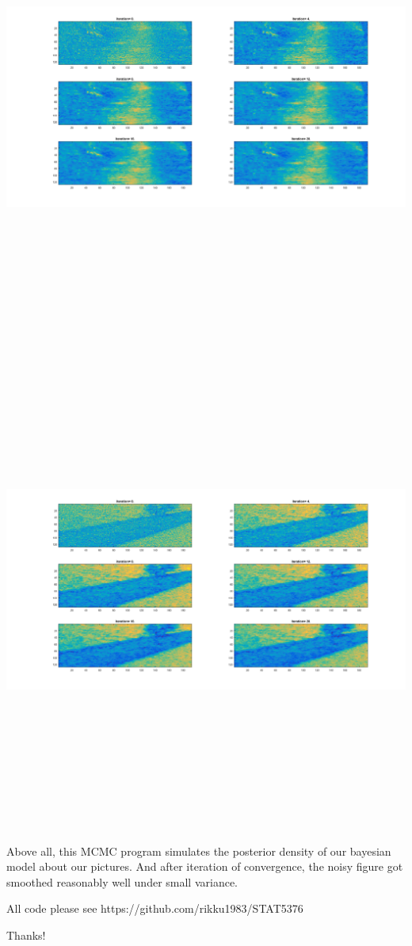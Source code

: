 \documentclass[11pt]{scrartcl}
\begin{document}
\includegraphics[width=160mm,height=160mm]{D4_10_20.png}\\
\includegraphics[width=160mm,height=160mm]{D5_10_20.png}\\
\bigskip

Above all, this MCMC program simulates the posterior density of our bayesian model about our pictures. And after iteration of convergence, the noisy figure got smoothed reasonably well under small variance. \\

\bigskip

All code please see https://github.com/rikku1983/STAT5376\\
\bigskip

Thanks!
\end{document}
